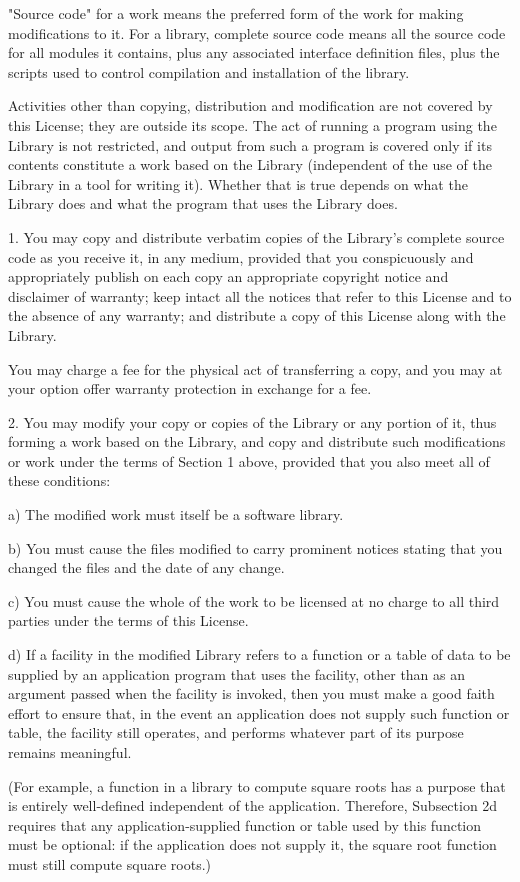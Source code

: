 \documentclass[a4paper,11pt]{report}
\begin{document}
"Source code" for a work means the preferred form of the work for
making modifications to it. For a library, complete source code means
all the source code for all modules it contains, plus any associated
interface definition files, plus the scripts used to control compilation
and installation of the library.

Activities other than copying, distribution and modification are not
covered by this License; they are outside its scope. The act of
running a program using the Library is not restricted, and output from
such a program is covered only if its contents constitute a work based
on the Library (independent of the use of the Library in a tool for
writing it). Whether that is true depends on what the Library does
and what the program that uses the Library does.

1. You may copy and distribute verbatim copies of the Library's
complete source code as you receive it, in any medium, provided that
you conspicuously and appropriately publish on each copy an
appropriate copyright notice and disclaimer of warranty; keep intact
all the notices that refer to this License and to the absence of any
warranty; and distribute a copy of this License along with the
Library.

You may charge a fee for the physical act of transferring a copy,
and you may at your option offer warranty protection in exchange for a
fee.

2. You may modify your copy or copies of the Library or any portion
of it, thus forming a work based on the Library, and copy and
distribute such modifications or work under the terms of Section 1
above, provided that you also meet all of these conditions:

\begin{indented}{1cm}
a) The modified work must itself be a software library.

b) You must cause the files modified to carry prominent notices
stating that you changed the files and the date of any change.

c) You must cause the whole of the work to be licensed at no
charge to all third parties under the terms of this License.

d) If a facility in the modified Library refers to a function or a
table of data to be supplied by an application program that uses
the facility, other than as an argument passed when the facility
is invoked, then you must make a good faith effort to ensure that,
in the event an application does not supply such function or
table, the facility still operates, and performs whatever part of
its purpose remains meaningful.

(For example, a function in a library to compute square roots has
a purpose that is entirely well-defined independent of the
application. Therefore, Subsection 2d requires that any
application-supplied function or table used by this function must
be optional: if the application does not supply it, the square
root function must still compute square roots.) 
\end{indented}
\end{document}
